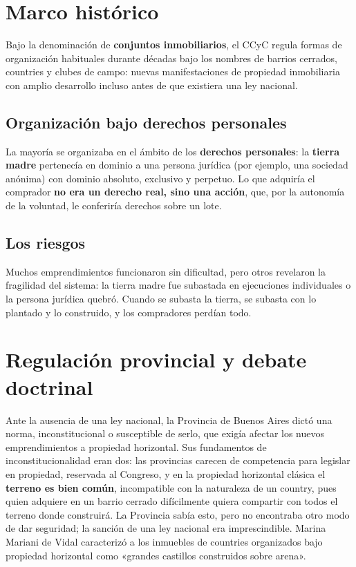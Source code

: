 \documentclass[12pt,oneside]{book}
\begin{document}
\section{Marco histórico}

Bajo la denominación de \textbf{conjuntos inmobiliarios}, el CCyC regula formas de organización habituales durante décadas bajo los nombres de barrios cerrados, countries y clubes de campo: nuevas manifestaciones de propiedad inmobiliaria con amplio desarrollo incluso antes de que existiera una ley nacional.

\subsection{Organización bajo derechos personales}

La mayoría se organizaba en el ámbito de los \textbf{derechos personales}: la \textbf{tierra madre} pertenecía en dominio a una persona jurídica (por ejemplo, una sociedad anónima) con dominio absoluto, exclusivo y perpetuo. Lo que adquiría el comprador \textbf{no era un derecho real, sino una acción}, que, por la autonomía de la voluntad, le conferiría derechos sobre un lote.

\subsection{Los riesgos}

Muchos emprendimientos funcionaron sin dificultad, pero otros revelaron la fragilidad del sistema: la tierra madre fue subastada en ejecuciones individuales o la persona jurídica quebró. Cuando se subasta la tierra, se subasta con lo plantado y lo construido, y los compradores perdían todo.

\section{Regulación provincial y debate doctrinal}

Ante la ausencia de una ley nacional, la Provincia de Buenos Aires dictó una norma, inconstitucional o susceptible de serlo, que exigía afectar los nuevos emprendimientos a propiedad horizontal. Sus fundamentos de inconstitucionalidad eran dos: las provincias carecen de competencia para legislar en propiedad, reservada al Congreso, y en la propiedad horizontal clásica el \textbf{terreno es bien común}, incompatible con la naturaleza de un country, pues quien adquiere en un barrio cerrado difícilmente quiera compartir con todos el terreno donde construirá. La Provincia sabía esto, pero no encontraba otro modo de dar seguridad; la sanción de una ley nacional era imprescindible. Marina Mariani de Vidal caracterizó a los inmuebles de countries organizados bajo propiedad horizontal como «grandes castillos construidos sobre arena».
\end{document}
